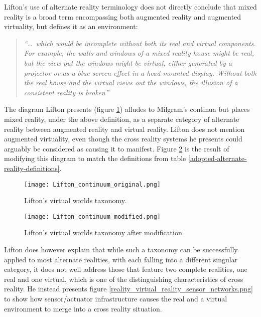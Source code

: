 Lifton's use of alternate reality terminology does not directly conclude that mixed reality is a broad term encompassing both augmented reality and augmented virtuality, but defines it as an environment:

\begin{quote}
	\textit{``\ldots\ which would be incomplete without both its real and virtual components. For example, the walls and windows of a mixed reality house might be real, but the view out the windows might be virtual, either generated by a projector or as a blue screen effect in a head-mounted display. Without both the real house and the virtual views out the windows, the illusion of a consistent reality is broken''}~\cite{Lifton2007a}
\end{quote}

The diagram Lifton presents (figure \ref{original_lifton_axis.png}) alludes to Milgram's continua but places mixed reality, under the above definition, as a separate category of alternate reality between augmented reality and virtual reality. Lifton does not mention augmented virtuality, even though the cross reality systems he presents could arguably be considered as causing it to manifest. Figure \ref{modified_lifton_axis.png} is the result of modifying this diagram to match the definitions from table \ref{adopted-alternate-reality-definitions}.

\begin{figure}[h]
	\centering
	\texttt{[image: Lifton\_continuum\_original.png]}
	\caption{Lifton's virtual worlds taxonomy.}
	\label{original_lifton_axis.png}
\end{figure}

\begin{figure}[h]
	\centering
	\texttt{[image: Lifton\_continuum\_modified.png]}
	\caption{Lifton's virtual worlds taxonomy after modification.}
	\label{modified_lifton_axis.png}
\end{figure}

Lifton does however explain that while such a taxonomy can be successfully applied to most alternate realities, with each falling into a different singular category, it does not well address those that feature two complete realities, one real and one virtual, which is one of the distinguishing characteristics of cross reality. He instead presents figure \ref{reality_virtual_reality_sensor_networks.png} to show how sensor/actuator infrastructure causes the real and a virtual environment to merge into a cross reality situation.

